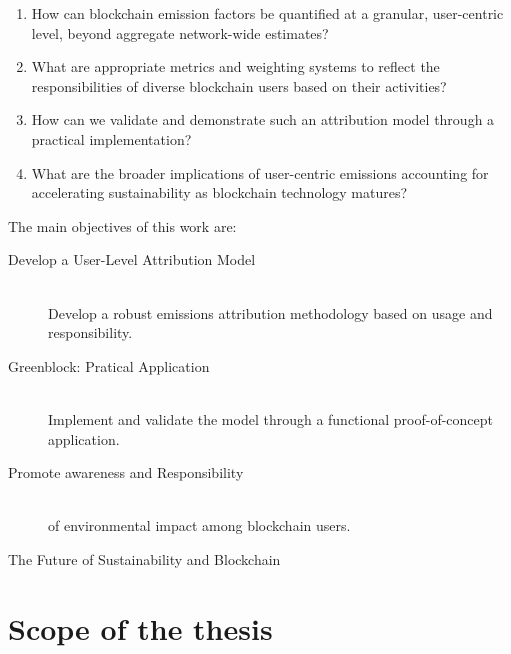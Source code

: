 \documentclass[11pt]{report}
\begin{document}
\begin{enumerate}
    \item How can blockchain emission factors be quantified at a granular, user-centric level, beyond aggregate network-wide estimates?
    \item What are appropriate metrics and weighting systems to reflect the responsibilities of diverse blockchain users based on their activities?
    \item How can we validate and demonstrate such an attribution model through a practical implementation?
    \item What are the broader implications of user-centric emissions accounting for accelerating sustainability as blockchain technology matures?
\end{enumerate}

The main objectives of this work are:

\begin{description}

    \item [Develop a User-Level Attribution Model] \hfill \\
          Develop a robust emissions attribution methodology based on usage and responsibility.
    \item [Greenblock: Pratical Application] \hfill \\
          Implement and validate the model through a functional proof-of-concept application.
    \item [Promote awareness and Responsibility] \hfill \\
          of environmental impact among blockchain users.
    \item [The Future of Sustainability and Blockchain] 
\end{description}

\section{Scope of the thesis}
\end{document}
